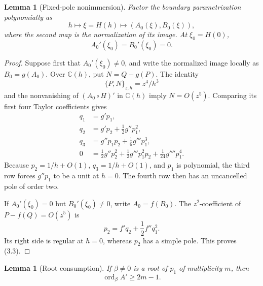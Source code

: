 \documentclass[11pt]{article}
\newtheorem{lemma}[theorem]{Lemma}
\theoremstyle{definition}
\theoremstyle{remark}
\newcommand{\ord}{\operatorname{ord}}
\begin{document}
\begin{lemma}[Fixed-pole nonimmersion]\label{lem:nonimmersion}
Factor the boundary parametrization polynomially as
\[
 h\longmapsto \xi=H(h)\longmapsto(A_0(\xi),B_0(\xi)),
\]
where the second map is the normalization of its image.  At
\(\xi_0=H(0)\),
\[
 A_0'(\xi_0)=B_0'(\xi_0)=0.                            \tag{3.3}
\]
\end{lemma}

\begin{proof}
Suppose first that \(A_0'(\xi_0)\ne0\), and write the normalized image
locally as \(B_0=g(A_0)\).  Over \(\mathbb C(h)\), put \(N=Q-g(P)\).
The identity
\[
 \{P,N\}_{z,h}=z^4/h^3
\]
and the nonvanishing of \((A_0\circ H)'\) in \(\mathbb C(h)\) imply
\(N=O(z^5)\).  Comparing its first four Taylor coefficients gives
\[
\begin{aligned}
q_1&=g'p_1,\\
q_2&=g'p_2+\frac12g''p_1^2,\\
q_3&=g''p_1p_2+\frac16g'''p_1^3,\\
0&=\frac12g''p_2^2+\frac12g'''p_1^2p_2
  +\frac1{24}g''''p_1^4.                               \tag{3.4}
\end{aligned}
\]
Because \(p_2=1/h+O(1)\), \(q_3=1/h+O(1)\), and \(p_1\) is
polynomial, the third row forces \(g''p_1\) to be a unit at \(h=0\).
The fourth row then has an uncancelled pole of order two.

If \(A_0'(\xi_0)=0\) but \(B_0'(\xi_0)\ne0\), write
\(A_0=f(B_0)\).  The \(z^2\)-coefficient of \(P-f(Q)=O(z^5)\) is
\[
 p_2=f'q_2+\frac12f''q_1^2.
\]
Its right side is regular at \(h=0\), whereas \(p_2\) has a simple
pole.  This proves (3.3).
\end{proof}

\begin{lemma}[Root consumption]\label{lem:consumption}
If \(\beta\ne0\) is a root of \(p_1\) of multiplicity \(m\), then
\[
   \ord_\beta A'\geq2m-1.                              \tag{3.5}
\]
\end{lemma}
\end{document}
